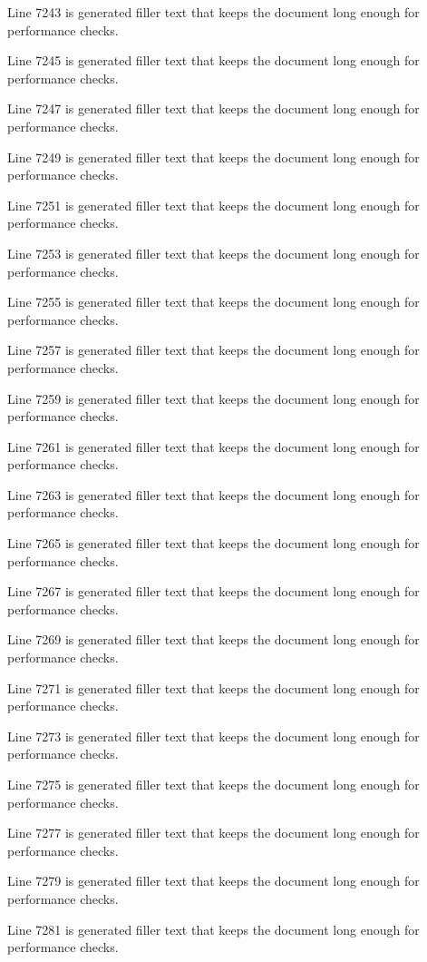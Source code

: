 Line 7243 is generated filler text that keeps the document long enough for performance checks.

Line 7245 is generated filler text that keeps the document long enough for performance checks.

Line 7247 is generated filler text that keeps the document long enough for performance checks.

Line 7249 is generated filler text that keeps the document long enough for performance checks.

Line 7251 is generated filler text that keeps the document long enough for performance checks.

Line 7253 is generated filler text that keeps the document long enough for performance checks.

Line 7255 is generated filler text that keeps the document long enough for performance checks.

Line 7257 is generated filler text that keeps the document long enough for performance checks.

Line 7259 is generated filler text that keeps the document long enough for performance checks.

Line 7261 is generated filler text that keeps the document long enough for performance checks.

Line 7263 is generated filler text that keeps the document long enough for performance checks.

Line 7265 is generated filler text that keeps the document long enough for performance checks.

Line 7267 is generated filler text that keeps the document long enough for performance checks.

Line 7269 is generated filler text that keeps the document long enough for performance checks.

Line 7271 is generated filler text that keeps the document long enough for performance checks.

Line 7273 is generated filler text that keeps the document long enough for performance checks.

Line 7275 is generated filler text that keeps the document long enough for performance checks.

Line 7277 is generated filler text that keeps the document long enough for performance checks.

Line 7279 is generated filler text that keeps the document long enough for performance checks.

Line 7281 is generated filler text that keeps the document long enough for performance checks.

